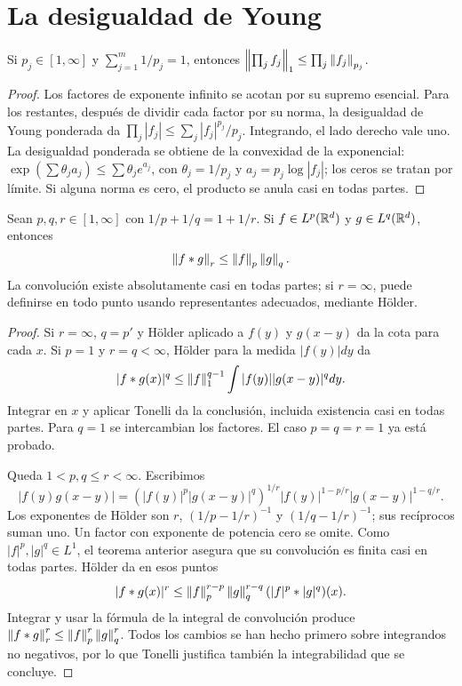 \section{La desigualdad de Young}
\begin{lema}
Si $p_j\in[1,\infty]$ y $\sum_{j=1}^m1/p_j=1$, entonces $\left\lVert\prod_j f_j\right\rVert_1\leq\prod_j\left\lVert f_j\right\rVert_{p_j}$.
\end{lema}
\begin{proof}
Los factores de exponente infinito se acotan por su supremo esencial. Para los restantes, después de dividir cada factor por su norma, la desigualdad de Young ponderada da $\prod_j|f_j|\leq\sum_j|f_j|^{p_j}/p_j$. Integrando, el lado derecho vale uno. La desigualdad ponderada se obtiene de la convexidad de la exponencial: $\exp(\sum\theta_j a_j)\leq\sum\theta_j e^{a_j}$, con $\theta_j=1/p_j$ y $a_j=p_j\log|f_j|$; los ceros se tratan por límite. Si alguna norma es cero, el producto se anula casi en todas partes.
\end{proof}
\begin{teorema}[Young]\label{v4:young-Rn}
Sean $p,q,r\in[1,\infty]$ con $1/p+1/q=1+1/r$. Si $f\in L^p(\mathbb R^d)$ y $g\in L^q(\mathbb R^d)$, entonces
\[
 \left\lVert f*g\right\rVert_r\leq\left\lVert f\right\rVert_p\left\lVert g\right\rVert_q.
\]
La convolución existe absolutamente casi en todas partes; si $r=\infty$, puede definirse en todo punto usando representantes adecuados, mediante Hölder.
\end{teorema}
\begin{proof}
Si $r=\infty$, $q=p'$ y Hölder aplicado a $f(y)$ y $g(x-y)$ da la cota para cada $x$. Si $p=1$ y $r=q<\infty$, Hölder para la medida $|f(y)|dy$ da
\[
 |f*g(x)|^q\leq\left\lVert f\right\rVert_1^{q-1}\int|f(y)||g(x-y)|^qdy.
\]
Integrar en $x$ y aplicar Tonelli da la conclusión, incluida existencia casi en todas partes. Para $q=1$ se intercambian los factores. El caso $p=q=r=1$ ya está probado.

Queda $1<p,q\leq r<\infty$. Escribimos
\[
 |f(y)g(x-y)|=
 (|f(y)|^p|g(x-y)|^q)^{1/r}
 |f(y)|^{1-p/r}|g(x-y)|^{1-q/r}.
\]
Los exponentes de Hölder son $r$, $(1/p-1/r)^{-1}$ y $(1/q-1/r)^{-1}$; sus recíprocos suman uno. Un factor con exponente de potencia cero se omite. Como $|f|^p,|g|^q\in L^1$, el teorema anterior asegura que su convolución es finita casi en todas partes. Hölder da en esos puntos
\[
 |f*g(x)|^r\leq\left\lVert f\right\rVert_p^{r-p}\left\lVert g\right\rVert_q^{r-q}(|f|^p*|g|^q)(x).
\]
Integrar y usar la fórmula de la integral de convolución produce $\left\lVert f*g\right\rVert_r^r\leq\left\lVert f\right\rVert_p^r\left\lVert g\right\rVert_q^r$. Todos los cambios se han hecho primero sobre integrandos no negativos, por lo que Tonelli justifica también la integrabilidad que se concluye.
\end{proof}
